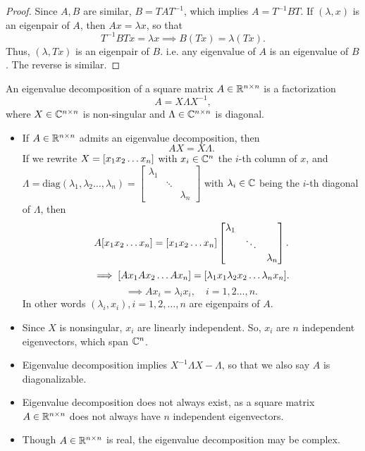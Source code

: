 \documentclass[../main/main.tex]{subfiles}
\begin{document}
\begin{proof}
		Since $A,B$ are similar, $B=TAT^{-1}$, which implies $A=T^{-1}BT$. If $\left( \lambda, x \right) $ is an eigenpair of $A$, then $Ax=\lambda x$, so that \[
				T^{-1}BTx=\lambda x\implies B\left( Tx \right) =\lambda\left( Tx \right) 
		.\] Thus, $\left( \lambda, Tx \right) $ is an eigenpair of $B$. i.e. any eigenvalue of $A$ is an eigenvalue of $B$. The reverse is similar.
\end{proof}
\begin{definition}
		An eigenvalue decomposition of a square matrix $A\in \mathbb{R}^{n\times n}$ is a factorization \[
		A=X\Lambda X^{-1}
		,\] where $X\in\mathbb{C}^{n\times n}$ is non-singular and $\Lambda\in\mathbb{C}^{n\times n}$ is diagonal.
\end{definition}
\begin{itemize}
		\item If $A\in \mathbb{R}^{n\times n}$ admits an eigenvalue decomposition, then \[
		AX=X\Lambda
	.\] If we rewrite $X=[x_1\space x_2\space \ldots\space x_n]$ with $x_{i}\in \mathbb{C}^{n}$ the $i$-th column of $x$, and $\Lambda=\text{diag}(\lambda_1,\lambda_2\ldots,\lambda_n)=\begin{bmatrix} \lambda_1&&\\&\ddots&\\&&\lambda_n \end{bmatrix} $ with $\lambda_{i}\in \mathbb{C}$ being the $i$-th diagonal of $\Lambda$, then \[
	A[x_1\space x_2\space \ldots\space x_n]=[x_1\space x_2\space \ldots\space x_n]\begin{bmatrix} \lambda_1&&\\&\ddots&\\&&\lambda_n \end{bmatrix}
	.\] \[
		\implies [Ax_1\space Ax_2\space \ldots\space Ax_n]=[\lambda_1 x_1\space \lambda_2 x_2\space \ldots\space \lambda_n x_n]
	.\] \[
		\implies Ax_{i}=\lambda_ix_{i},\quad i=1,2\ldots,n
	.\] 
	In other words $\left( \lambda_i,x_{i} \right) ,i=1,2,\ldots,n$ are eigenpairs of $A$.
\item Since $X$ is nonsingular, $x_{i}$ are linearly independent. So, $x_{i}$ are $n$ independent eigenvectors, which span $\mathbb{C}^{n}$.
\item Eigenvalue decomposition implies $X^{-1}\Lambda X - \Lambda$, so that we also say $A$ is diagonalizable.
\item Eigenvalue decomposition does not always exist, as a square matrix $A\in \mathbb{R}^{n\times n}$ does not always have $n$ independent eigenvectors.
\item Though $A\in \mathbb{R}^{n\times n}$ is real, the eigenvalue decomposition may be complex.
\end{itemize}
\end{document}
